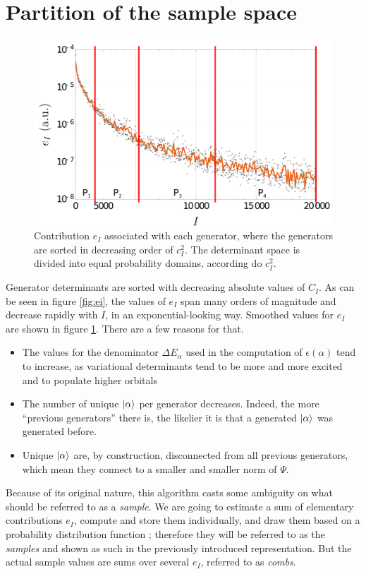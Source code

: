 \documentclass[./thesis.tex]{subfiles}
\begin{document}
\section{Partition of the sample space}
\label{sec:partition}


\begin{figure}[h!]
	\begin{center}
		\includegraphics[width=0.7\columnwidth]{figures/pt2/P_i}
	\end{center}
	\caption{Contribution $e_I$ associated with each generator, where the generators are sorted in decreasing order of $c_I^2$. The determinant space is divided into equal probability domains, according do $c_I^2$.}
	\label{fig:p_i}
\end{figure}

Generator determinants are sorted with decreasing absolute values of $C_I$.
As can be seen in figure \ref{fig:ei}, the values of $e_I$ span many orders of magnitude and decrease rapidly with $I$, in an exponential-looking way. Smoothed values for $e_I$ are shown in figure \ref{fig:p_i}. There are a few reasons for that.
\begin{itemize}
	\item
	The values for the denominator $\Delta E_\alpha$ used in the computation of $\epsilon(\alpha)$ tend to increase, as variational determinants tend to be more and more excited and to populate higher orbitals 
	\item
	The number of unique $\ket \alpha$ per generator decreases. Indeed, the more ``previous generators'' there is, the likelier it is that a generated $\ket \alpha$ was generated before.
	\item
	Unique $\ket \alpha$ are, by construction, disconnected from all previous generators, which mean they connect to a smaller and smaller norm of $\Psi$.
\end{itemize}


Because of its original nature, this algorithm casts some ambiguity on what should be referred to as a \emph{sample}. We are going to estimate a sum of elementary contributions $e_I$, compute and store them individually, and draw them based on a probability distribution function ; therefore they will be referred to as the \emph{samples} and shown as such in the previously introduced representation. But the actual sample values are sums over several $e_I$, referred to as \emph{combs}.
\end{document}
